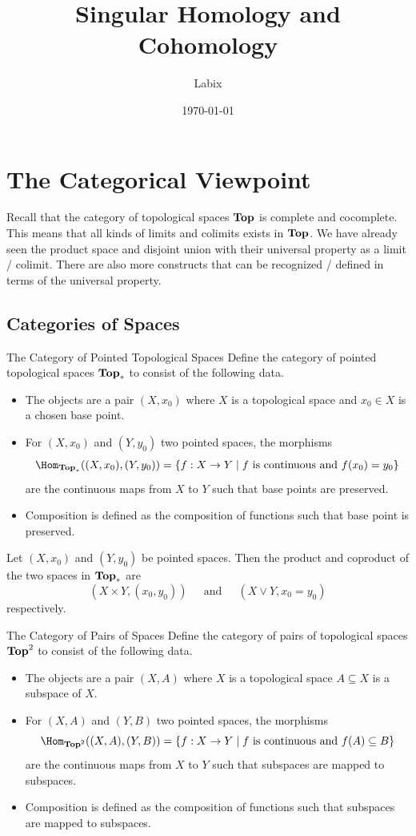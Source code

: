\documentclass[a4paper]{article}
\title{Singular Homology and Cohomology}
\author{Labix}
\date{\today}
\begin{document}
\maketitle

\pagebreak
\tableofcontents

\pagebreak
\section{The Categorical Viewpoint}
Recall that the category of topological spaces $\bold{Top}$ is complete and cocomplete. This means that all kinds of limits and colimits exists in $\bold{Top}$. We have already seen the product space and disjoint union with their universal property as a limit / colimit. There are also more constructs that can be recognized / defined in terms of the universal property. 

\subsection{Categories of Spaces}
\begin{defn}{The Category of Pointed Topological Spaces}{} Define the category of pointed topological spaces $\bold{Top}_\ast$ to consist of the following data. 
\begin{itemize}
\item The objects are a pair $(X,x_0)$ where $X$ is a topological space and $x_0\in X$ is a chosen base point. 
\item For $(X,x_0)$ and $(Y,y_0)$ two pointed spaces, the morphisms $$\Hom_{\bold{Top}_\ast}((X,x_0),(Y,y_0))=\{f:X\to Y\;|\;f\text{ is continuous and }f(x_0)=y_0\}$$ are the continuous maps from $X$ to $Y$ such that base points are preserved. 
\item Composition is defined as the composition of functions such that base point is preserved. 
\end{itemize}
\end{defn}

\begin{prp}{}{} Let $(X,x_0)$ and $(Y,y_0)$ be pointed spaces. Then the product and coproduct of the two spaces in $\bold{Top}_\ast$ are $$(X\times Y,(x_0,y_0))\;\;\;\;\text{ and }\;\;\;\;(X\vee Y,x_0=y_0)$$ respectively. 
\end{prp}

\begin{defn}{The Category of Pairs of Spaces}{} Define the category of pairs of topological spaces $\bold{Top}^2$ to consist of the following data. 
\begin{itemize}
\item The objects are a pair $(X,A)$ where $X$ is a topological space $A\subseteq X$ is a subspace of $X$. 
\item For $(X,A)$ and $(Y,B)$ two pointed spaces, the morphisms $$\Hom_{\bold{Top}^2}((X,A),(Y,B))=\{f:X\to Y\;|\;f\text{ is continuous and }f(A)\subseteq B\}$$ are the continuous maps from $X$ to $Y$ such that subspaces are mapped to subspaces. 
\item Composition is defined as the composition of functions such that subspaces are mapped to subspaces. 
\end{itemize}
\end{defn}
\end{document}
